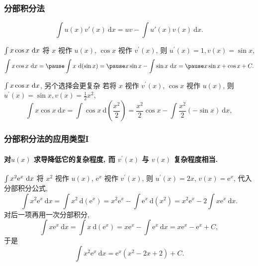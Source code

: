 \documentclass[
10pt,
aspectratio=43,
]{beamer}
\begin{document}
\begin{frame}
	\frametitle{分部积分法}
	\everymath{\displaystyle}
	\begin{block}{}
		$$
			\int u(x)v'(x)\mathrm{~d} x = uv - \int u'(x)v(x)\mathrm{~d} x.
		$$
	\end{block}
	\pause 
	{\small
	\begin{exampleblock}{$\color{black}\int x \cos x \mathrm{~d} x$}
		将 $x$ 视作 $u(x)$, $\cos x$ 视作 $v^{\prime}(x)$, 则 $u^{\prime}(x)=1, v(x)=\sin x$,
		$$
			\int x \cos x \mathrm{~d} x  =\pause \int x \mathrm{~d}(\sin x)  =\pause x \sin x-\int \sin x \mathrm{~d} x=\pause x \sin x+\cos x+C.
		$$
	\end{exampleblock}
	\pause 
	\begin{alertblock}{$\color{black}\int x \cos x \mathrm{~d} x$, {\color{black}另个选择会更复杂}}
		若将 $x$ 视作 $v^{\prime}(x)$, $\cos x$ 视作 $u(x)$, 则 $u^{\prime}(x)=\sin x, v(x)=\frac{1}{2}x^2$,
		$$
			\int x \cos x \mathrm{~d} x=\int \cos x \mathrm{~d}\left(\frac{x^2}{2}\right)=\frac{x^2}{2} \cos x-\int \frac{x^2}{2}(-\sin x) \mathrm{~d} x,
		$$
	\end{alertblock}
}
\end{frame}

\begin{frame}
	\frametitle{分部积分法的应用类型I}
	\framesubtitle{对$u(x)$ 求导降低它的复杂程度, 而 $v^{\prime}(x)$ 与 $v(x)$ 复杂程度相当. }
	\everymath{\displaystyle}
	\begin{exampleblock}{$\color{black}\int x^2 \mathrm{e}^x \mathrm{~d} x$}
		\pause 将 $x^2$ 视作 $u(x)$, $\mathrm{e}^x$ 视作 $v^{\prime}(x)$, \pause 则 $u^{\prime}(x)=2 x$, $v(x)=\mathrm{e}^x$, 代入分部积分公式,
		$$
			\int x^2 \mathrm{e}^x \mathrm{~d} x=\int x^2 \mathrm{~d}\left(\mathrm{e}^x\right)=x^2 \mathrm{e}^x-\int \mathrm{e}^x \mathrm{~d}\left(x^2\right)=x^2 \mathrm{e}^x-2 \int x \mathrm{e}^x \mathrm{~d} x.
		$$
		\pause 对后一项再用一次分部积分,
		$$
			\int x \mathrm{e}^x \mathrm{~d} x=\int x \mathrm{~d}\left(\mathrm{e}^x\right)=x \mathrm{e}^x-\int \mathrm{e}^x \mathrm{~d} x=x \mathrm{e}^x-\mathrm{e}^x+C,
		$$
		\pause 于是
		$$
			\int x^2 \mathrm{e}^x \mathrm{~d} x=\mathrm{e}^x\left(x^2-2 x+2\right)+C.
		$$
	\end{exampleblock}
\end{frame}
\end{document}
